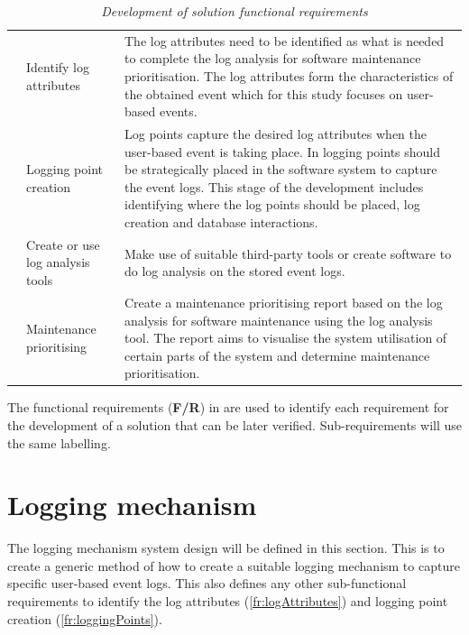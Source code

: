 \setcounter{phase}{0}
\begin{table}[!htb]
	\centering
	\caption[Development of solution functional requirements]
	{\textit{Development of solution functional requirements}}
	\label{tbl:ch2_developmenetRequirements}
	\begin{tabularx}{\textwidth}{llX}
		\toprule
		\thead{Requirement ID} & \thead{Name} & \thead{Description} \\
		\midrule

		\rowcolor{lightgray}
		\phase{fr:logAttributes} & Identify log attributes & \RaggedRight The log attributes need to be identified as what is needed to complete the log analysis for software maintenance prioritisation. The log attributes form the characteristics of the obtained event which for this study focuses on user-based events. \\

		\phase{fr:loggingPoints} & Logging point creation & \RaggedRight Log points capture the desired log attributes when the user-based event is taking place. In \Cref{sec:ch1_loggignPoints} logging points should be strategically placed in the software system to capture the event logs. This stage of the development includes identifying where the log points should be placed, log creation and database interactions.\\

		\rowcolor{lightgray}
		\phase{fr:logAnalysis} & \RaggedRight Create or use log analysis tools & Make use of suitable third-party tools or create software to do log analysis on the stored event logs. \\

		\phase{fr:maintenancePrioritising} & \RaggedRight Maintenance prioritising & Create a maintenance prioritising report based on the log analysis for software maintenance using the log analysis tool. The report aims to visualise the system utilisation of certain parts of the system and determine maintenance prioritisation.\\
		\bottomrule
	\end{tabularx}
\end{table}

The functional requirements (\textbf{F/R}) in  are used to identify each requirement for the development of a solution that can be later verified. Sub-requirements will use the same labelling. 

\section{Logging mechanism}\label{sec:ch2_loggingMechanism}
The logging mechanism system design will be defined in this section. This is to create a generic method of how to create a suitable logging mechanism to capture specific user-based event logs. This also defines any other sub-functional requirements to identify the log attributes (\ref{fr:logAttributes}) and logging point creation (\ref{fr:loggingPoints}).

